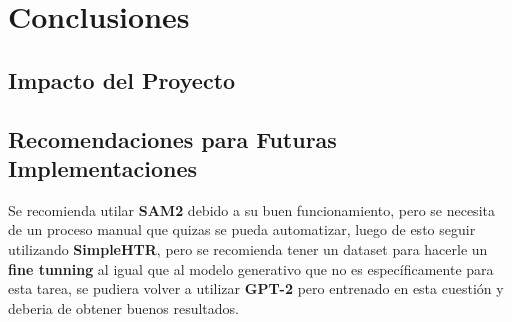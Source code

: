 \documentclass[11pt,a4paper]{article}
\begin{document}
\section{Conclusiones} 
\subsection{Impacto del Proyecto} 

\subsection{Recomendaciones para Futuras Implementaciones}
Se recomienda utilar \textbf{SAM2} debido a su buen funcionamiento, pero se necesita de un proceso manual que quizas se pueda automatizar, luego de esto seguir utilizando \textbf{SimpleHTR}, pero se recomienda tener un dataset para hacerle un \textbf{fine tunning} al igual que al modelo generativo que no es espec\'ificamente para esta tarea, se pudiera volver a utilizar \textbf{GPT-2} pero entrenado en esta cuesti\'on y deberia de obtener buenos resultados.

 

\end{document}
